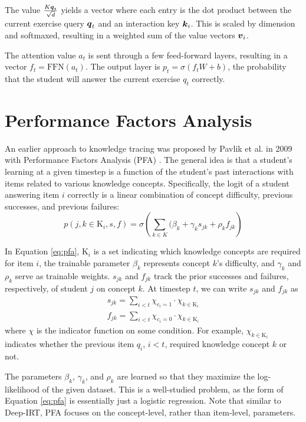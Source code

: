 The value $\frac{K \boldsymbol{q}_t}{\sqrt{d}}$ yields a vector where each entry is the dot product between the current exercise query $\boldsymbol{q}_t$ and an interaction key $\boldsymbol{k}_i$. This is scaled by dimension and softmaxed, resulting in a weighted sum of the value vectors $\boldsymbol{v}_i$.

The attention value $a_t$ is sent through a few feed-forward layers, resulting in a vector $f_t = \text{FFN}(a_t)$. The output layer is $p_t = \sigma(f_t W + b)$, the probability that the student will answer the current exercise $q_t$ correctly.


\section{Performance Factors Analysis}
An earlier approach to knowledge tracing was proposed by Pavlik et al. in 2009 with Performance Factors Analysis (PFA) \cite{pavlik2009}. The general idea is that a student's learning at a given timestep is a function of the student's past interactions with items related to various knowledge concepts. Specifically, the logit of a student answering item $i$ correctly is a linear combination of concept difficulty, previous successes, and previous failures:
\begin{equation}
  p(j,k\in \text{K}_i, s, f) = \sigma\left(\sum_{k \in K}(\beta_k + \gamma_k s_{jk} + \rho_k f_{jk}\right)
  \label{eq:pfa}
\end{equation}

In Equation \ref{eq:pfa}, $\text{K}_i$ is a set indicating which knowledge concepts are required for item $i$, the trainable parameter $\beta_k$ represents concept $k$'s difficulty, and $\gamma_k$ and $\rho_k$ serve as trainable weights. $s_{jk}$ and $f_{jk}$ track the prior successes and failures, respectively, of student $j$ on concept $k$. At timestep $t$, we can write $s_{jk}$ and $f_{jk}$ as 
\begin{equation}
  \begin{split}
    s_{jk} = \sum_{i<t} \chi_{c_i=1} \cdot \chi_{k \in \text{K}_i} \\
    f_{jk} = \sum_{i<t} \chi_{c_i=0} \cdot \chi_{k \in \text{K}_i}
  \end{split}
  \label{eq:pfa_indicator}
\end{equation}
where $\chi$ is the indicator function on some condition. For example, $\chi_{k\in \text{K}_i}$ indicates whether the previous item $q_i$, $i<t$, required knowledge concept $k$ or not.

The parameters $\beta_k$, $\gamma_k$, and $\rho_k$ are learned so that they maximize the log-likelihood of the given dataset. This is a well-studied problem, as the form of Equation \ref{eq:pfa} is essentially just a logistic regression. Note that similar to Deep-IRT, PFA focuses on the concept-level, rather than item-level, parameters. 

